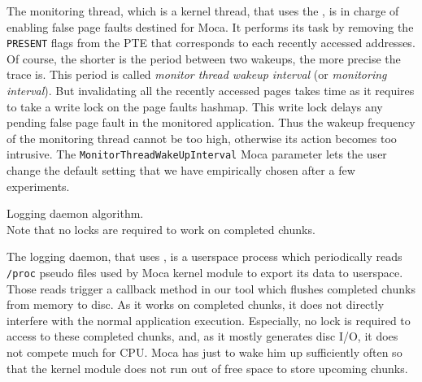The monitoring thread, which is a kernel thread, that uses the , is in charge of enabling false page faults destined for \gls{Moca}.
It performs its task by removing the \texttt{PRESENT} flags from the \gls{PTE} that corresponds to each recently accessed addresses.
Of course, the shorter is the period between two wakeups, the more precise the trace is.
This period is called \emph{monitor thread wakeup interval} (or \emph{monitoring interval}).
But invalidating all the recently accessed pages takes time as it requires to take a write lock on the page faults hashmap.
This write lock delays any pending false page fault in the monitored application.
Thus the wakeup frequency of the monitoring thread cannot be too high, otherwise its action becomes too intrusive.
The \texttt{MonitorThreadWakeUpInterval} \gls{Moca} parameter lets the user change the default setting that we have empirically chosen after a few experiments.

\begin{algorithm}[htb]
    \caption[Moca Logging daemon algorithm.]{Logging daemon algorithm.\\
        \footnotesize{Note that no locks are required to work on completed chunks.}}
    \label{alg:moca-log}
    \begin{algorithmic}[1]
                \State {}
                \State {}
                \EndFor
            \EndFor
            \State {}
        \EndWhile
    \end{algorithmic}
\end{algorithm}

The logging daemon, that uses , is a userspace process which periodically reads \texttt{/proc} pseudo files used by \gls{Moca} kernel module to export its data to userspace.
Those reads trigger a callback method in our tool which flushes completed chunks from memory to disc.
As it works on completed chunks, it does not directly interfere with the normal application execution.
Especially, no lock is required to access to these completed chunks, and, as it mostly generates disc I/O, it does not compete much for CPU.
\gls{Moca} has just to wake him up sufficiently often so that the kernel module does not run out of free space to store upcoming chunks.

